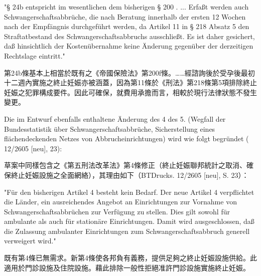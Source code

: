 \documentclass[12pt]{article}
\begin{document}
\begin{sourcepara}[title={原文理由 A.II.2.a 引文 1}]
\begin{lawbox}
"§ 24b entspricht im wesentlichen dem bisherigen § 200 \abbrF{} \abbrRVO{}. ... Erfaßt werden auch Schwangerschaftsabbrüche, die nach Beratung innerhalb der ersten 12 Wochen nach der Empfängnis durchgeführt werden, da Artikel 11 in § 218 Absatz 5 \abbrStGB{} den Straftatbestand des Schwangerschaftsabbruchs ausschließt. Es ist daher gesichert, daß hinsichtlich der Kostenübernahme keine Änderung gegenüber der derzeitigen Rechtslage eintritt."
\end{lawbox}
\end{sourcepara}
\begin{transpara}
\begin{lawbox}
第24b條基本上相當於既有之《帝國保險法》第200f條。……經諮詢後於受孕後最初十二週內實施之終止妊娠亦被涵蓋，因為第11條於《刑法》第218條第5項排除終止妊娠之犯罪構成要件。因此可確保，就費用承擔而言，相較於現行法律狀態不發生變更。
\end{lawbox}
\end{transpara}

\begin{sourcepara}[title={原文理由 A.II.2.a 引文 2 前文}]
Die im Entwurf ebenfalls enthaltene Änderung des \abbrArt{} 4 des 5. \abbrStrRG{} (Wegfall der Bundesstatistik über Schwangerschaftsabbrüche, Sicherstellung eines flächendeckenden Netzes von Abbrucheinrichtungen) wird wie folgt begründet (\abbrBTDrucks{} 12/2605 [neu], \abbrS{} 23):
\end{sourcepara}
\begin{transpara}
草案中同樣包含之《第五刑法改革法》第4條修正（終止妊娠聯邦統計之取消、確保終止妊娠設施之全面網絡），其理由如下（BTDrucks. 12/2605 [neu], S. 23）：
\end{transpara}

\begin{sourcepara}[title={原文理由 A.II.2.a 引文 2}]
\begin{lawbox}
"Für den bisherigen Artikel 4 besteht kein Bedarf. Der neue Artikel 4 verpflichtet die Länder, ein ausreichendes Angebot an Einrichtungen zur Vornahme von Schwangerschaftsabbrüchen zur Verfügung zu stellen. Dies gilt sowohl für ambulante als auch für stationäre Einrichtungen. Damit wird ausgeschlossen, daß die Zulassung ambulanter Einrichtungen zum Schwangerschaftsabbruch generell verweigert wird."
\end{lawbox}
\end{sourcepara}
\begin{transpara}
\begin{lawbox}
既有第4條已無需求。新第4條使各邦負有義務，提供足夠之終止妊娠設施供給。此適用於門診設施及住院設施。藉此排除一般性拒絕准許門診設施實施終止妊娠。
\end{lawbox}
\end{transpara}
\end{document}
